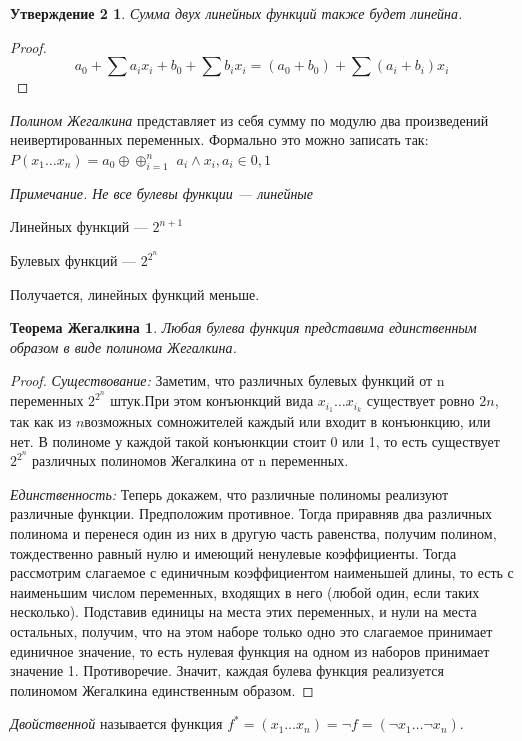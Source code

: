 \documentclass[a4paper, 12pt]{article}
\newtheorem*{n2}{Утверждение 2}
\newtheorem*{zhegalkin}{Теорема Жегалкина}
\begin{document}
\begin{n2}
Сумма двух линейных функций также будет линейна.
\end{n2}
\begin{proof}
\[a_0 + \sum a_ix_i + b_0 + \sum b_ix_i = (a_0 + b_0) + \sum (a_i + b_i)x_i\]
\end{proof}

\textit{Полином Жегалкина} представляет из себя сумму по модулю два произведений неивертированных переменных. Формально это можно записать так: $P(x_1 \ldots x_n) = a_0 \oplus${\Large $\oplus_{i = 1}^n$} $a_i \wedge x_i, a_i \in {0,1}$

\textit{Примечание. Не все булевы функции --- линейные}

Линейных функций --- $2^{n+1}$

Булевых функций --- $2^{2^n}$

Получается, линейных функций меньше.

\begin{zhegalkin}
Любая булева функция представима единственным образом в виде полинома Жегалкина.
\end{zhegalkin}
\begin{proof}
 \textit{Существование: }Заметим, что различных булевых функций от n переменных $2^{2^n}$ штук.При этом конъюнкций вида $x_{i_1}\ldots x_{i_k}$ существует ровно $2n$, так как из $n $возможных сомножителей каждый или входит в конъюнкцию, или нет. В полиноме у каждой такой конъюнкции стоит 0 или 1, то есть существует $2^{2^n}$ различных полиномов Жегалкина от n переменных. 
 
 \textit{Единственность: }Теперь докажем, что различные полиномы реализуют различные функции. Предположим противное. Тогда приравняв два различных полинома и перенеся один из них в другую часть равенства, получим полином, тождественно равный нулю и имеющий ненулевые коэффициенты. Тогда рассмотрим слагаемое с единичным коэффициентом наименьшей длины, то есть с наименьшим числом переменных, входящих в него (любой один, если таких несколько). Подставив единицы на места этих переменных, и нули на места остальных, получим, что на этом наборе только одно это слагаемое принимает единичное значение, то есть нулевая функция на одном из наборов принимает значение 1. Противоречие. Значит, каждая булева функция реализуется полиномом Жегалкина единственным образом.
 \end{proof}

\textit{Двойственной} называется функция $f^* = (x_1 \ldots x_n) = \lnot f = (\lnot x_1 \ldots \lnot x_n)$.
\end{document}
